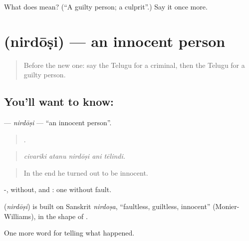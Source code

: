 \begin{tcolorbox}[breakable,colback=teal!4,colframe=teal!35!black,title={Before you move on}]
What does  mean? (\textquotedblleft{}A guilty person; a culprit\textquotedblright{}.) Say it once more.
\end{tcolorbox}
\section[\texorpdfstring{\te{నిర్దోషి} (nirdōṣi)}{నిర్దోషి (nirdōṣi)}]{ (nirdōṣi) — an innocent person}

\label{lesson:TE-C350-nirdosi}



\begin{quote}
Before the new one: say the Telugu for a criminal, then the Telugu for a guilty person.
\end{quote}

\subsection*{You'll want to know: }
\textbf{} — \emph{nirdōṣi} — \textquotedblleft{}an innocent person\textquotedblright{}.

\begin{quote}
    .
\end{quote}

\begin{quote}
\emph{civariki atanu nirdōṣi ani tēlindi.}
\end{quote}

\begin{quote}
In the end he turned out to be innocent.
\end{quote}

-, without, and : one without fault.

\begin{cousinweb}
\textbf{} (\emph{nirdōṣi}) is built on Sanskrit \emph{nirdoṣa}, \textquotedblleft{}faultless, guiltless, innocent\textquotedblright{} (Monier-Williams), in the shape of .
\end{cousinweb}

\begin{grammarlens}[title={What you've built}]
One more word for telling what happened.
\end{grammarlens}

